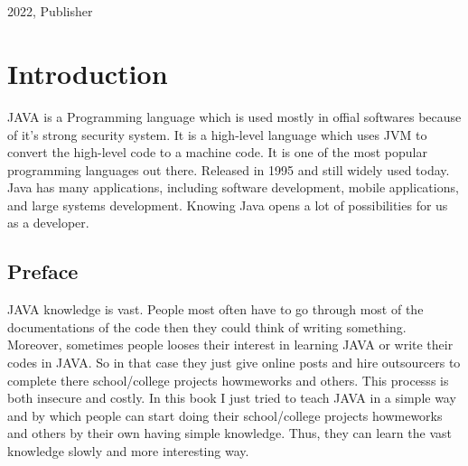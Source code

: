\documentclass[A4 paper,openany]{book}  %
\begin{document}
\begin{titlepage}
{\begin{verbatim}
                                                                                                      
                                                                                                      
        \end{verbatim}
    }
    \vfill
    {\small{2022, Publisher}}
\end{titlepage}


\pagecolor{smokeWhite}
\color{black}
\newpage
\tableofcontents
\newpage
\listoffigures
\newpage
\listoftables
\newpage

% 
% 
\part{Introduction}
JAVA\cite{Ref1} is a Programming language which is used mostly in offial softwares because of it's strong security system.
It is a high-level language which uses JVM to convert the high-level code to a machine code.
It is one of the most popular programming languages out there. Released in 1995 and still widely used today.
Java has many applications, including software development, mobile applications, and large systems development.
Knowing Java opens a lot of possibilities for us as a developer.

\chapter*{Preface}
JAVA knowledge is vast. People most often have to go through most of the documentations of the code then they could think of writing something.
Moreover, sometimes people looses their interest in learning JAVA or write their codes in JAVA. So in that case they just give online posts
and hire outsourcers to complete there school/college projects howmeworks and others.
This processs is both insecure and costly. In this book I just tried to teach JAVA  in a simple way and by which
people can start doing their school/college projects howmeworks and others by their own having simple knowledge. Thus, they can learn the vast knowledge slowly and more interesting way.

% 
% 
\end{document}
